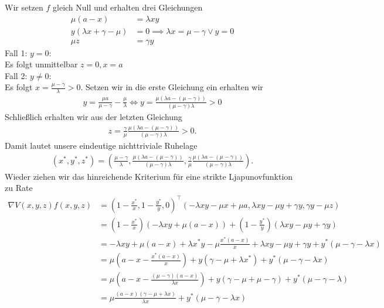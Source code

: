 \begin{solution}
Wir setzen $f$ gleich Null und erhalten drei Gleichungen
\begin{align}
  \mu (a-x) &= \lambda xy \\
  y(\lambda x + \gamma - \mu) &= 0 \implies \lambda x  = \mu - \gamma \lor y = 0\\
  \mu z &= \gamma y \label{3}
\end{align}
Fall 1: $y = 0$: \\
Es folgt unmittelbar $z = 0, x = a$ \\
Fall 2: $y \neq 0$: \\
Es folgt $x = \frac{\mu - \gamma}{\lambda} > 0$. Setzen wir in die erste Gleichung ein
erhalten wir
\begin{align*}
  y = \frac{\mu a}{\mu - \gamma} - \frac{\mu}{\lambda}
  \iff y = \frac{\mu(\lambda a - (\mu - \gamma))}{(\mu - \gamma)\lambda} > 0
\end{align*}
Schließlich erhalten wir aus der letzten Gleichung
\begin{align*}
  z = \frac{\gamma}{\mu} \frac{\mu(\lambda a - (\mu - \gamma))}{(\mu - \gamma)\lambda} > 0.
\end{align*}
Damit lautet unsere eindeutige nichttriviale Ruhelage
\begin{align*}
  (x^*,y^*,z^*) = (\frac{\mu - \gamma}{\lambda},\frac{\mu(\lambda a - (\mu - \gamma))}{(\mu - \gamma)\lambda},
    \frac{\gamma}{\mu} \frac{\mu(\lambda a - (\mu - \gamma))}{(\mu - \gamma)\lambda}).
\end{align*}
Wieder ziehen wir das hinreichende Kriterium für eine strikte Ljapunovfunktion zu Rate
\begin{align*}
  \nabla V(x,y,z)f(x,y,z) &= (1 - \frac{x^*}{x}, 1 - \frac{y^*}{y}, 0)^{\top}
  (- \lambda xy - \mu x + \mu a,\lambda xy - \mu y + \gamma y, \gamma y - \mu z) \\
  &= (1 - \frac{x^*}{x})(- \lambda xy + \mu (a - x)) + (1 - \frac{y^*}{y})(\lambda xy - \mu y + \gamma y) \\
  &= - \lambda xy + \mu (a - x) + \lambda x^*y - \mu \frac{x^*(a-x)}{x} + \lambda xy - \mu y + \gamma y
  + y^*(\mu - \gamma - \lambda x)  \\
  &= \mu (a - x - \frac{x^*(a-x)}{x}) + y(\gamma - \mu + \lambda x^*) + y^*(\mu - \gamma - \lambda x) \\
  &= \mu (a - x - \frac{(\mu - \gamma)(a-x)}{\lambda x}) + y(\gamma - \mu + \mu - \gamma) +
  y^*(\mu - \gamma - \lambda) \\
  &=\mu \frac{(a-x)(\gamma - \mu + \lambda x)}{\lambda x} + y^*(\mu - \gamma - \lambda x) \\

\end{align*}
\end{solution}

